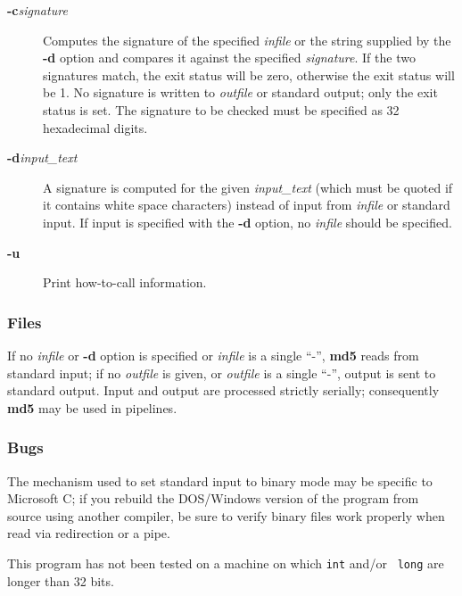 \begin{description}

\item [{\bf -c}{\it signature}  ]
   Computes the signature of the specified {\it infile} or the string  supplied
by the {\bf -d} option and compares it against the specified  {\it signature}.
If the two signatures match, the exit status will be zero,  otherwise the exit
status will be 1. No signature is written to  {\it outfile} or standard
output; only the exit status is set. The  signature to be checked must be
specified as 32 hexadecimal digits.  

\item [{\bf -d}{\it input\_text}  ]
   A signature is computed for the given {\it input\_text} (which must be  quoted
if it contains white space characters) instead of input from  {\it infile} or
standard input. If input is specified with the {\bf -d}  option, no {\it
infile} should be specified.  

\item [{\bf -u}  ]
   Print how-to-call information. 
   \end{description}

\subsubsection*{Files}

If no {\it infile} or {\bf -d} option is specified or {\it infile} is a single
``-'', {\bf md5} reads from standard input; if no {\it outfile} is given, or
{\it outfile} is a single ``-'', output is sent to standard output. Input and
output are processed strictly serially; consequently {\bf md5} may be used in
pipelines. 

\subsubsection*{Bugs}

The mechanism used to set standard input to binary mode may be specific to
Microsoft C; if you rebuild the DOS/Windows version of the program from source
using another compiler, be sure to verify binary files work properly when read
via redirection or a pipe. 

This program has not been tested on a machine on which {\tt int} and/or {\tt
long} are longer than 32 bits. 

